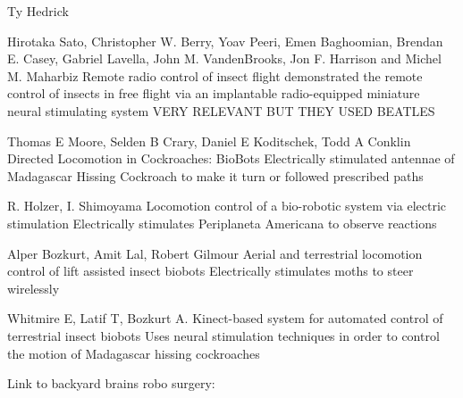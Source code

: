 Ty Hedrick

Hirotaka Sato, Christopher W. Berry, Yoav Peeri, Emen Baghoomian, Brendan E. Casey, Gabriel Lavella, John M. VandenBrooks, Jon F. Harrison and Michel M. Maharbiz
Remote radio control of insect flight
demonstrated the remote control of insects in free flight via an implantable radio-equipped miniature neural stimulating system
VERY RELEVANT BUT THEY USED BEATLES %

Thomas E Moore, Selden B Crary, Daniel E Koditschek, Todd A Conklin
Directed Locomotion in Cockroaches: BioBots
Electrically stimulated antennae of Madagascar Hissing Cockroach to make it turn or followed prescribed paths

R. Holzer, I. Shimoyama
Locomotion control of a bio-robotic system via electric stimulation
Electrically stimulates Periplaneta Americana to observe reactions

Alper Bozkurt, Amit Lal, Robert Gilmour
Aerial and terrestrial locomotion control of lift assisted insect biobots
Electrically stimulates moths to steer wirelessly

Whitmire E, Latif T, Bozkurt A.
Kinect-based system for automated control of terrestrial insect biobots
Uses neural stimulation techniques in order to control the motion of Madagascar hissing cockroaches

Link to backyard brains robo surgery: %
